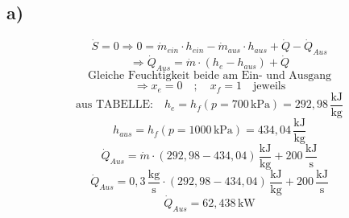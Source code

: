

\subsection*{a)}
\[
\dot{S} = 0 \Rightarrow 0 = \dot{m}_{ein} \cdot h_{ein} - \dot{m}_{aus} \cdot h_{aus} + \dot{Q} - \dot{Q}_{Aus}
\]
\[
\Rightarrow \dot{Q}_{Aus} = \dot{m} \cdot (h_e - h_{aus}) + \dot{Q}
\]
\[
\text{Gleiche Feuchtigkeit beide am Ein- und Ausgang}
\]
\[
\Rightarrow x_e = 0 \quad ; \quad x_f = 1 \quad \text{jeweils}
\]
\[
\text{aus TABELLE:} \quad h_e = h_f (p = 700 \, \text{kPa}) = 292,98 \, \frac{\text{kJ}}{\text{kg}}
\]
\[
h_{aus} = h_f (p = 1000 \, \text{kPa}) = 434,04 \, \frac{\text{kJ}}{\text{kg}}
\]
\[
\dot{Q}_{Aus} = \dot{m} \cdot \left(292,98 - 434,04\right) \, \frac{\text{kJ}}{\text{kg}} + 200 \, \frac{\text{kJ}}{\text{s}}
\]
\[
\dot{Q}_{Aus} = 0,3 \, \frac{\text{kg}}{\text{s}} \cdot \left(292,98 - 434,04\right) \, \frac{\text{kJ}}{\text{kg}} + 200 \, \frac{\text{kJ}}{\text{s}}
\]
\[
\dot{Q}_{Aus} = 62,438 \, \text{kW}
\]